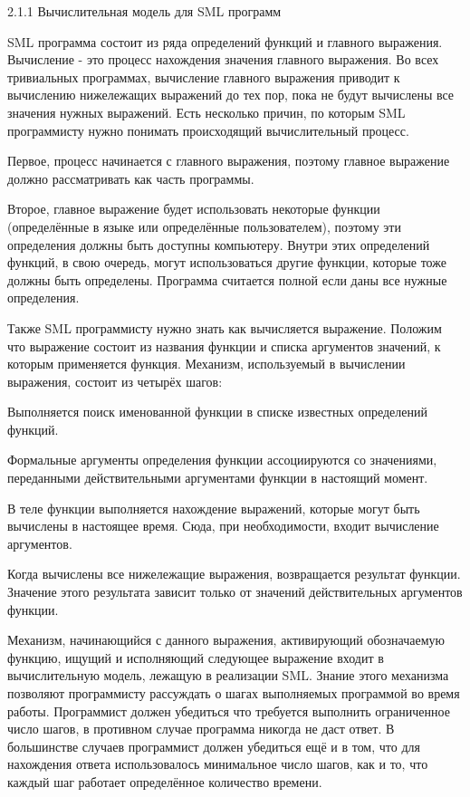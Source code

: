 2.1.1 Вычислительная модель для SML программ

SML программа состоит из ряда определений функций и главного выражения. Вычисление - это процесс нахождения значения главного выражения. Во всех тривиальных программах, вычисление главного выражения приводит к вычислению нижележащих выражений до тех пор, пока не будут вычислены все значения нужных выражений. Есть несколько причин, по которым SML программисту нужно понимать происходящий вычислительный процесс.

Первое, процесс начинается с главного выражения, поэтому главное выражение должно рассматривать как часть программы.

Второе, главное выражение будет использовать некоторые функции (определённые в языке или определённые пользователем), поэтому эти определения должны быть доступны компьютеру. Внутри этих определений функций, в свою очередь, могут использоваться другие функции, которые тоже должны быть определены. Программа считается полной если даны все нужные определения.

Также SML программисту нужно знать как вычисляется выражение. Положим что выражение состоит из названия функции и списка аргументов значений, к которым применяется функция. Механизм, используемый в вычислении выражения, состоит из четырёх шагов:

Выполняется поиск именованной функции в списке известных определений функций.

Формальные аргументы определения функции ассоциируются со значениями, переданными действительными аргументами функции в настоящий момент.

В теле функции выполняется нахождение выражений, которые могут быть вычислены в настоящее время. Сюда, при необходимости, входит вычисление аргументов.

Когда вычислены все нижележащие выражения, возвращается результат функции. Значение этого результата зависит только от значений действительных аргументов функции.

Механизм, начинающийся с данного выражения, активирующий обозначаемую функцию, ищущий и исполняющий следующее выражение входит в вычислительную модель, лежащую в реализации SML. Знание этого механизма позволяют программисту рассуждать о шагах выполняемых программой во время работы. Программист должен убедиться что требуется выполнить ограниченное число шагов, в противном случае программа никогда не даст ответ. В большинстве случаев программист должен убедиться ещё и в том, что для нахождения ответа использовалось минимальное число шагов, как и то, что каждый шаг работает определённое количество времени.

